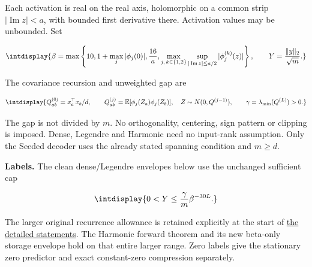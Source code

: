 
Each activation is real on the real axis, holomorphic on a common strip \(|\operatorname{Im}z|<a\), with bounded first derivative there. Activation values may be unbounded. Set


\begingroup\renewcommand{\theHequation}{intdisplay.2}
\begin{equation*}
\intdisplay{
\beta=\max\left\{10,1+\max_j|\phi_j(0)|,\frac{16}{a},
\max_{j,\,k\in\{1,2\}}\sup_{|\operatorname{Im}z|\le a/2}
|\phi_j^{(k)}(z)|\right\},\qquad Y=\frac{\|y\|_2}{\sqrt m}.
}
\end{equation*}
\endgroup


The covariance recursion and unweighted gap are


\begingroup\renewcommand{\theHequation}{intdisplay.3}
\begin{equation*}
\intdisplay{
Q^{(0)}_{ab}=x_a^\top x_b/d,\qquad
Q^{(j)}_{ab}=\mathbb E[\phi_j(Z_a)\phi_j(Z_b)],\quad
Z\sim N(0,Q^{(j-1)}),\qquad
\gamma=\lambda_{\min}(Q^{(L)})>0.
}
\end{equation*}
\endgroup


The gap is not divided by \(m\). No orthogonality, centering, sign pattern or clipping is imposed. Dense, Legendre and Harmonic need no input-rank assumption. Only the Seeded decoder uses the already stated spanning condition and \(m\ge d\).



\textbf{Labels.} The clean dense/Legendre envelopes below use the unchanged sufficient cap


\begingroup\renewcommand{\theHequation}{intdisplay.4}
\begin{equation}
\intdisplay{
0<Y\le\frac\gamma m\beta^{-30L}.
}
\label{int:eq-0001-labels}
\end{equation}
\endgroup


The larger original recurrence allowance is retained explicitly at the start of \hyperref[int:detailed-statements]{the detailed statements}. The Harmonic forward theorem and its new beta-only storage envelope hold on that entire larger range. Zero labels give the stationary zero predictor and exact constant-zero compression separately.


